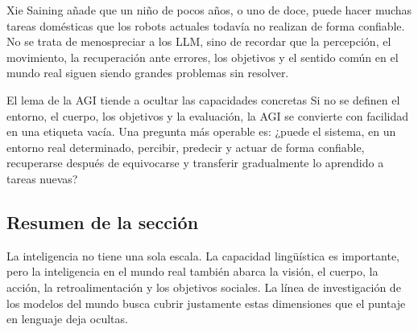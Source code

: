 Xie Saining añade que un niño de pocos años, o uno de doce, puede hacer muchas tareas domésticas que los robots actuales todavía no realizan de forma confiable. No se trata de menospreciar a los LLM, sino de recordar que la percepción, el movimiento, la recuperación ante errores, los objetivos y el sentido común en el mundo real siguen siendo grandes problemas sin resolver.

\begin{warningbox}{El lema de la AGI tiende a ocultar las capacidades concretas}
Si no se definen el entorno, el cuerpo, los objetivos y la evaluación, la AGI se convierte con facilidad en una etiqueta vacía. Una pregunta más operable es: ¿puede el sistema, en un entorno real determinado, percibir, predecir y actuar de forma confiable, recuperarse después de equivocarse y transferir gradualmente lo aprendido a tareas nuevas?
\end{warningbox}

\subsection{Resumen de la sección}

La inteligencia no tiene una sola escala. La capacidad lingüística es importante, pero la inteligencia en el mundo real también abarca la visión, el cuerpo, la acción, la retroalimentación y los objetivos sociales. La línea de investigación de los modelos del mundo busca cubrir justamente estas dimensiones que el puntaje en lenguaje deja ocultas.

